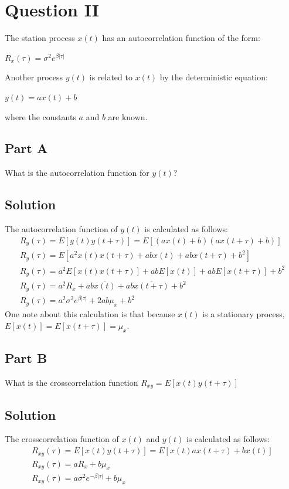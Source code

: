 \documentclass{article}
\begin{document}
\section*{Question II}
The station process $x(t)$ has an autocorrelation function of the form:
\begin{center}
    $R_x(\tau) = \sigma^2 e^{\beta |\tau|}$
\end{center}
Another process $y(t)$ is related to $x(t)$ by the deterministic equation:
\begin{center}
    $y(t) = ax(t) + b$
\end{center}
where the constants $a$ and $b$ are known.
\subsection*{Part A}
What is the autocorrelation function for $y(t)$?
\subsection*{Solution}
The autocorrelation function of $y(t)$ is calculated as follows:
\begin{gather*}
    R_y(\tau) = E\left[y(t)y(t + \tau)\right] = E\left[(ax(t)+b)(ax(t+\tau)+b)\right] \\
    R_y(\tau) = E\left[a^2x(t)x(t+\tau) + abx(t) + abx(t+\tau) + b^2\right] \\
    R_y(\tau) = a^2E\left[x(t)x(t+\tau)\right] + abE\left[x(t)\right] + abE\left[x(t+\tau)\right] + b^2 \\
    R_y(\tau) = a^2R_x + ab\bar{x(t)} + ab\bar{x(t+\tau)} + b^2 \\
    R_y(\tau) = a^2\sigma^2e^{\beta|\tau|} + 2ab\mu_x + b^2
\end{gather*}
One note about this calculation is that because $x(t)$ is a stationary process, $E\left[x(t)\right] = E\left[x(t+\tau)\right] = \mu_x$.

\subsection*{Part B}
What is the crosscorrelation function $R_{xy} = E\left[x(t)y(t+\tau)\right]$
\subsection*{Solution}
The crosscorrelation function of $x(t)$ and $y(t)$ is calculated as follows:
\begin{gather*}
    R_{xy}(\tau) = E\left[x(t)y(t+\tau)\right] = E\left[x(t)ax(t+\tau) + bx(t)\right] \\
    R_{xy}(\tau) = aR_x + b\mu_x \\
    R_{xy}(\tau) = a\sigma^2e^{-\beta|\tau|} + b\mu_x
\end{gather*}
\end{document}
